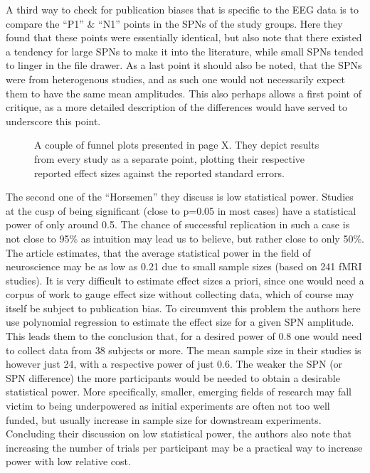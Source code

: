 \documentclass{article}
\begin{document}
A third way to check for publication biases that is specific to the EEG data is to compare the ``P1'' \& ``N1'' points in the SPNs of the study groups. Here they found that these points were essentially identical, but also note that there existed a tendency for large SPNs to make it into the literature, while small SPNs tended to linger in the file drawer. As a last point it should also be noted, that the SPNs were from heterogenous studies, and as such one would not necessarily expect them to have the same mean amplitudes. This also perhaps allows a first point of critique, as a more detailed description of the differences would have served to underscore this point. 

\begin{figure}[h]
    \centering
    \caption{A couple of funnel plots presented in \cite{brainrecordings} page X. They depict results from every study as a separate point, plotting their respective reported effect sizes against the reported standard errors.}
    \label{fig:funnel}
\end{figure}

The second one of the ``Horsemen'' they discuss is low statistical power. Studies at the cusp of being significant (close to p=0.05 in most cases) have a statistical power of only around 0.5. The chance of successful replication in such a case is not close to 95\% as intuition may lead us to believe, but rather close to only 50\%. The article \cite{powerfailure} estimates, that the average statistical power in the field of neuroscience may be as low as 0.21 due to small sample sizes (based on 241 fMRI studies). It is very difficult to estimate effect sizes a priori, since one would need a corpus of work to gauge effect size without collecting data, which of course may itself be subject to publication bias. To circumvent this problem the authors here use polynomial regression to estimate the effect size for a given SPN amplitude. This leads them to the conclusion that, for a desired power of 0.8 one would need to collect data from 38 subjects or more. The mean sample size in their studies is however just 24, with a respective power of just 0.6. The weaker the SPN (or SPN difference) the more participants would be needed to obtain a desirable statistical power. More specifically, smaller, emerging fields of research may fall victim to being underpowered as initial experiments are often not too well funded, but usually increase in sample size for downstream experiments. Concluding their discussion on low statistical power, the authors also note that increasing the number of trials per participant may be a practical way to increase power with low relative cost. \\
\end{document}
